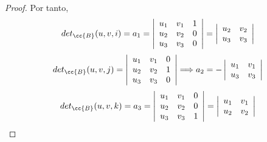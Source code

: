 \begin{proof}
    Por tanto,
    \begin{equation*}
        det_{\cc{B}} (u,v,i) = a_1 = \left|\begin{array}{ccc}
            u_1 & v_1 & 1\\
            u_2 & v_2 & 0\\
            u_3 & v_3 & 0\\
        \end{array}\right| = 
        \left|\begin{array}{ccc}
            u_2 & v_2\\
            u_3 & v_3\\
        \end{array}\right|
    \end{equation*}
    \begin{equation*}
        det_{\cc{B}} (u,v,j) = \left|\begin{array}{ccc}
            u_1 & v_1 & 0\\
            u_2 & v_2 & 1\\
            u_3 & v_3 & 0\\
        \end{array}\right| \Longrightarrow 
        a_2 = - \left|\begin{array}{ccc}
            u_1 & v_1\\
            u_3 & v_3\\
        \end{array}\right|
    \end{equation*}
    \begin{equation*}
        det_{\cc{B}} (u,v,k) = a_3 = \left|\begin{array}{ccc}
            u_1 & v_1 & 0\\
            u_2 & v_2 & 0\\
            u_3 & v_3 & 1\\
        \end{array}\right| = 
        \left|\begin{array}{ccc}
            u_1 & v_1\\
            u_2 & v_2\\
        \end{array}\right|
    \end{equation*}
\end{proof}


